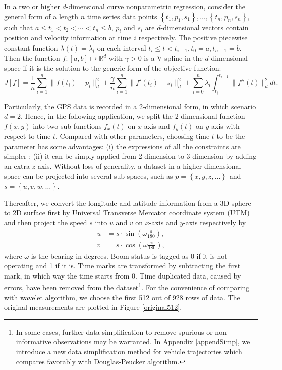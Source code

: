 In a two or higher $d$-dimensional curve nonparametric regression, consider the general form of a length $n$ time series data points $\left\lbrace t_1,p_1,s_1\right\rbrace, \ldots, \left\lbrace t_n,p_n,s_n\right\rbrace$, such that $a \leq t_1<t_2< \cdots < t_n \leq b$, $p_i$ and $s_i$ are $d$-dimensional vectors contain position and velocity information at time $i$ respectively. The positive piecewise constant function $\lambda(t) = \lambda_i$ on each interval $t_i \leq t<t_{i+1}, t_0=a, t_{n+1}=b$.  Then the function $f:[a,b]\mapsto\mathbb{R}^d$ with $\gamma>0$ is a V-spline in the $d$-dimensional space if it is the solution to the generic form of the objective function: 
\begin{equation}\label{tractorsplineObjective2D}
J[f]= \frac{1}{n} \sum_{i=1}^{n} \lVert f(t_i)-p_i\rVert_d^2 + \frac{\gamma}{n} \sum_{i=1}^{n} \lVert f'(t_i)-s_i \rVert_d^2 +\sum_{i=0}^{n} \lambda_i\int_{t_i}^{t_{i+1}} \lVert f''(t)\rVert_d^2 dt. 
\end{equation}


Particularly, the GPS data is recorded in a 2-dimensional form, in which scenario $d=2$. Hence, in the following application, we split the 2-dimensional function $f(x,y)$ into two sub functions $f_x(t)$ on $x$-axis and $f_y(t)$ on $y$-axis with respect to time $t$. Compared with other parameters, choosing time $t$ to be the parameter has some advantages: (i) the expressions of all the constraints are simpler \citep{zhang2013cubic}; (ii) it can be simply applied from 2-dimension to 3-dimension by adding an extra $z$-axis. Without loss of generality, a dataset in a higher dimensional space can be projected into several sub-spaces, such as $p=\left\lbrace x,y,z,\ldots \right\rbrace$ and $s=\left\lbrace u,v,w,\ldots \right\rbrace$. 


Thereafter, we convert the longitude and latitude information from a 3D sphere to 2D surface first by Universal Transverse Mercator coordinate system (UTM) and then project the speed $s$ into $u$ and $v$ on $x$-axis and $y$-axis respectively by 
\begin{align}
u &=s\cdot \sin \left(\omega\frac{\pi}{180}\right),\\
v &= s\cdot \cos \left(\omega\frac{\pi}{180}\right),
\end{align}
where $\omega$ is the bearing in degrees. Boom status is tagged as 0 if it is not operating and 1 if it is. Time marks are transformed by subtracting the first mark, in which way the time starts from 0. Time duplicated data, caused by errors, have been removed from the dataset\footnote{In some cases, further data simplification to remove spurious or non-informative observations may be warranted. In Appendix \ref{appendSimp}, we introduce a new data simplification method for vehicle trajectories which compares favorably with Douglas-Peucker algorithm.  }. For the convenience of comparing with wavelet algorithm, we choose the first 512 out of 928 rows of data. The original measurements are plotted in Figure \ref{original512}.


